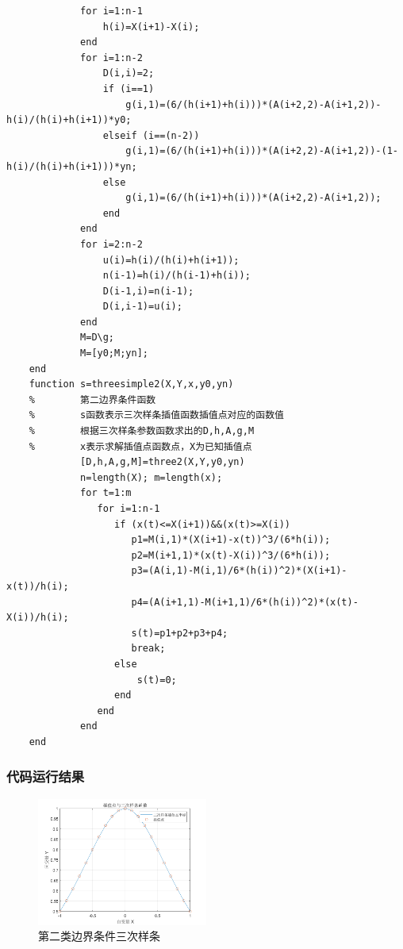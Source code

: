 \documentclass[UTF8,a4paper,10pt]{ctexart}
\begin{document}
\begin{lstlisting}
             for i=1:n-1
                 h(i)=X(i+1)-X(i);
             end        
             for i=1:n-2
                 D(i,i)=2;
                 if (i==1)
                     g(i,1)=(6/(h(i+1)+h(i)))*(A(i+2,2)-A(i+1,2))-h(i)/(h(i)+h(i+1))*y0;
                 elseif (i==(n-2))
                     g(i,1)=(6/(h(i+1)+h(i)))*(A(i+2,2)-A(i+1,2))-(1-h(i)/(h(i)+h(i+1)))*yn;
                 else
                     g(i,1)=(6/(h(i+1)+h(i)))*(A(i+2,2)-A(i+1,2));
                 end             
             end
             for i=2:n-2
                 u(i)=h(i)/(h(i)+h(i+1));
                 n(i-1)=h(i)/(h(i-1)+h(i));
                 D(i-1,i)=n(i-1);
                 D(i,i-1)=u(i);             
             end
             M=D\g;
             M=[y0;M;yn];         
    end
    function s=threesimple2(X,Y,x,y0,yn)
    %        第二边界条件函数 
    %        s函数表示三次样条插值函数插值点对应的函数值
    %        根据三次样条参数函数求出的D,h,A,g,M
    %        x表示求解插值点函数点，X为已知插值点        
             [D,h,A,g,M]=three2(X,Y,y0,yn)
             n=length(X); m=length(x);    
             for t=1:m
                for i=1:n-1
                   if (x(t)<=X(i+1))&&(x(t)>=X(i))
                      p1=M(i,1)*(X(i+1)-x(t))^3/(6*h(i));
                      p2=M(i+1,1)*(x(t)-X(i))^3/(6*h(i));
                      p3=(A(i,1)-M(i,1)/6*(h(i))^2)*(X(i+1)-x(t))/h(i);
                      p4=(A(i+1,1)-M(i+1,1)/6*(h(i))^2)*(x(t)-X(i))/h(i);
                      s(t)=p1+p2+p3+p4; 
                      break;
                   else
                       s(t)=0; 
                   end
                end
             end
    end
  \end{lstlisting}
  \subsubsection{代码运行结果}
	\begin{figure}[!htbp]
		\centering
		\includegraphics[width=0.5\textwidth,height=0.375\textwidth]{pictures/3sp2.png}
		\caption{第二类边界条件三次样条} \label{3sp2}
	\end{figure}
\end{document}
